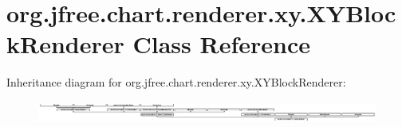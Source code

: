 \hypertarget{classorg_1_1jfree_1_1chart_1_1renderer_1_1xy_1_1_x_y_block_renderer}{}\section{org.\+jfree.\+chart.\+renderer.\+xy.\+X\+Y\+Block\+Renderer Class Reference}
\label{classorg_1_1jfree_1_1chart_1_1renderer_1_1xy_1_1_x_y_block_renderer}
Inheritance diagram for org.\+jfree.\+chart.\+renderer.\+xy.\+X\+Y\+Block\+Renderer\+:\begin{figure}[H]
\begin{center}
\leavevmode
\includegraphics[height=0.706625cm]{classorg_1_1jfree_1_1chart_1_1renderer_1_1xy_1_1_x_y_block_renderer}
\end{center}
\end{figure}
